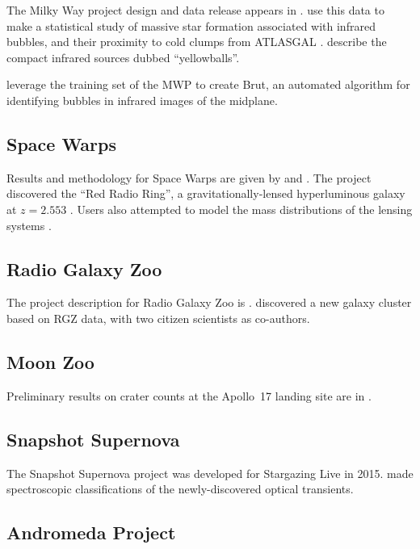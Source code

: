 \documentclass[twocolumn]{aastex6}
\begin{document}
The Milky Way project design and data release appears in \citet{sim12a}. \citet{ken12} use this data to make a statistical study of massive star formation associated with infrared bubbles, and their proximity to cold clumps from ATLASGAL \citep{ken16}. \citet{ker15} describe the compact infrared sources dubbed ``yellowballs''.

\citet{bea14} leverage the training set of the MWP to create Brut, an automated algorithm for identifying bubbles in infrared images of the midplane.

\subsection{Space Warps}

Results and methodology for Space Warps are given by \citet{mar16} and \citet{mor16}. The project discovered the ``Red Radio Ring'', a gravitationally-lensed hyperluminous galaxy at $z=2.553$ \citep{gea15}. Users also attempted to model the mass distributions of the lensing systems \citep{kun15}.

\subsection{Radio Galaxy Zoo}

The project description for Radio Galaxy Zoo is \citet{ban15}. \citet{ban16} discovered a new galaxy cluster based on RGZ data, with two citizen scientists as co-authors. 

\subsection{Moon Zoo}

Preliminary results on crater counts at the Apollo~17 landing site are in \citet{bug16}.

\subsection{Snapshot Supernova}

The Snapshot Supernova project was developed for Stargazing Live in 2015. \citet{cam15,car15} made spectroscopic classifications of the newly-discovered optical transients.

\subsection{Andromeda Project}
\end{document}
